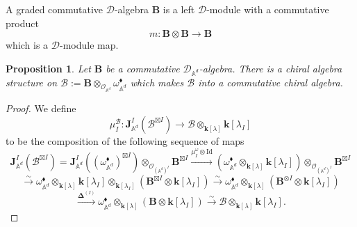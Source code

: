 \documentclass[11pt]{amsart}
\newtheorem{prop}[thm]{Proposition}
\theoremstyle{definition}
\theoremstyle{remark}
\numberwithin{equation}{section}
\begin{document}
A graded commutative $\mathcal{D}$-algebra $\mathbf{B}$ is a left $\mathcal{D}$-module with a commutative product
$$
m\colon\mathbf{B}\otimes\mathbf{B}\rightarrow \mathbf{B}
$$
which is a $\mathcal{D}$-module map.
\begin{prop}\label{prop:commop}
  Let $\mathbf{B}$ be a commutative $\mathcal{D}_{\mathbb{A}^d}$-algebra.
  There is a chiral algebra structure on $\mathcal{B}:=\mathbf{B}\otimes_{\mathcal{O}_{\mathbb{A}^d}} \omega_{\mathbb{A}^d}^{\blacklozenge}$ which makes $\mathcal{B}$ into a commutative chiral algebra.
\end{prop}
\begin{proof}
  We define
  $$
  \mu^{\mathcal{B}}_{{I}}:\mathbf{J}^{{I}}_{\mathbb{A}^d}(\mathcal{B}^{\boxtimes I})\rightarrow \mathcal{B}\otimes_{\mathbf{k}[\lambda]}\mathbf{k}[\lambda_{I}]
  $$
  to be the composition of the following sequence of maps
  $$
\mathbf{J}^{{I}}_{\mathbb{A}^d}(\mathcal{B}^{\boxtimes{I}})=  \mathbf{J}^{{I}}_{\mathbb{A}^d}((\omega_{\mathbb{A}^d}^{\blacklozenge})^{\boxtimes I})\otimes_{\mathcal{O}_{(\mathbb{A}^d)^I}} \mathbf{B}^{\boxtimes{I}}\xrightarrow{\mu^{\omega}_{{I}}\otimes \mathrm{Id}}\left(\omega_{\mathbb{A}^d}^{\blacklozenge}\otimes_{\mathbf{k}[\lambda]}\mathbf{k}[\lambda_{I}]\right)\otimes_{\mathcal{O}_{(\mathbb{A}^d)^I}}\mathbf{B}^{\boxtimes{I}}
  $$
  $$
  \xrightarrow{\sim}\omega_{\mathbb{A}^d}^{\blacklozenge}\otimes_{\mathbf{k}[\lambda]}\mathbf{k}[\lambda_{I}]\otimes_{\mathbf{k}[\lambda_{I}]} \left( \mathbf{B}^{\boxtimes I}\otimes \mathbf{k}[\lambda_{I}]\right)  \xrightarrow{\sim}\omega_{\mathbb{A}^d}^{\blacklozenge}\otimes_{\mathbf{k}[\lambda]} \left( \mathbf{B}^{\otimes{I}}\otimes \mathbf{k}[\lambda_{I}]\right)
  $$
  $$
  \xrightarrow{\mathbf{\Delta}^{({I})}}\omega_{\mathbb{A}^d}^{\blacklozenge}\otimes_{\mathbf{k}[\lambda]} \left( \mathbf{B}\otimes \mathbf{k}[\lambda_{I}]\right)\xrightarrow{\sim}\mathcal{B}\otimes_{\mathbf{k}[\lambda]}\mathbf{k}[\lambda_{I}].
  $$
  \iffalse
  $$
\mathbf{J}^{{I}}_{\mathbb{A}^d}(\mathcal{B}^{\boxtimes{I}})=  \mathbf{J}^{{I}}_{\mathbb{A}^d}((\omega_{\mathbb{A}^d}^{\blacklozenge})^{\boxtimes I})\otimes_{\mathbf{k}} \mathrm{Sym}(\mathbf{k}[\lambda]\otimes L)^{\otimes{I}}\xrightarrow{\mu^{\omega}_{{I}}\otimes \mathrm{Id}}\omega_{\mathbb{A}^d}^{\blacklozenge}\otimes_{\mathbf{k}[\lambda]}\mathbf{k}[\lambda_{I}]\otimes \mathrm{Sym}(\mathbf{k}[\lambda]\otimes L)^{\otimes{I}}
  $$
  $$
  \xrightarrow{\sim}\omega_{\mathbb{A}^d}^{\blacklozenge}\otimes_{\mathbf{k}[\lambda]}\mathbf{k}[\lambda_{I}]\otimes_{\mathbf{k}[\lambda_{I}]} \left( \mathrm{Sym}(\mathbf{k}[\lambda]\otimes L)^{\otimes{I}}\otimes \mathbf{k}[\lambda_{I}]\right)  \xrightarrow{\sim}\omega_{\mathbb{A}^d}^{\blacklozenge}\otimes_{\mathbf{k}[\lambda]} \left( \mathrm{Sym}(\mathbf{k}[\lambda]\otimes L)^{\otimes{I}}\otimes \mathbf{k}[\lambda_{I}]\right)
  $$
  $$
  \xrightarrow{\mathbf{\Delta}^{({I})}}\omega_{\mathbb{A}^d}^{\blacklozenge}\otimes_{\mathbf{k}[\lambda]} \left( \mathrm{Sym}(\mathbf{k}[\lambda]\otimes L)\otimes \mathbf{k}[\lambda_{I}]\right)\xrightarrow{\sim}\mathcal{B}\otimes_{\mathbf{k}[\lambda]}\mathbf{k}[\lambda_{I}].
  $$
  \fi


\end{proof}
\end{document}

